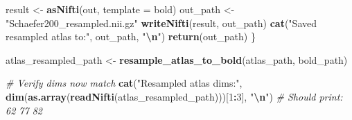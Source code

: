 \documentclass[
]{article}
\newenvironment{Shaded}{\begin{snugshade}}{\end{snugshade}}
\newcommand{\AttributeTok}[1]{\textcolor[rgb]{0.13,0.29,0.53}{#1}}
\newcommand{\CommentTok}[1]{\textcolor[rgb]{0.56,0.35,0.01}{\textit{#1}}}
\newcommand{\DecValTok}[1]{\textcolor[rgb]{0.00,0.00,0.81}{#1}}
\newcommand{\FunctionTok}[1]{\textcolor[rgb]{0.13,0.29,0.53}{\textbf{#1}}}
\newcommand{\NormalTok}[1]{#1}
\newcommand{\OtherTok}[1]{\textcolor[rgb]{0.56,0.35,0.01}{#1}}
\newcommand{\SpecialCharTok}[1]{\textcolor[rgb]{0.81,0.36,0.00}{\textbf{#1}}}
\newcommand{\StringTok}[1]{\textcolor[rgb]{0.31,0.60,0.02}{#1}}
\begin{document}
\begin{Shaded}
\begin{Highlighting}[]
\NormalTok{  result   }\OtherTok{\textless{}{-}} \FunctionTok{asNifti}\NormalTok{(out, }\AttributeTok{template =}\NormalTok{ bold)}
\NormalTok{  out\_path }\OtherTok{\textless{}{-}} \StringTok{"Schaefer200\_resampled.nii.gz"}
  \FunctionTok{writeNifti}\NormalTok{(result, out\_path)}
  \FunctionTok{cat}\NormalTok{(}\StringTok{"Saved resampled atlas to:"}\NormalTok{, out\_path, }\StringTok{"}\SpecialCharTok{\textbackslash{}n}\StringTok{"}\NormalTok{)}
  \FunctionTok{return}\NormalTok{(out\_path)}
\NormalTok{\}}

\NormalTok{atlas\_resampled\_path }\OtherTok{\textless{}{-}} \FunctionTok{resample\_atlas\_to\_bold}\NormalTok{(atlas\_path, bold\_path)}

\CommentTok{\# Verify dims now match}
\FunctionTok{cat}\NormalTok{(}\StringTok{"Resampled atlas dims:"}\NormalTok{, }\FunctionTok{dim}\NormalTok{(}\FunctionTok{as.array}\NormalTok{(}\FunctionTok{readNifti}\NormalTok{(atlas\_resampled\_path)))[}\DecValTok{1}\SpecialCharTok{:}\DecValTok{3}\NormalTok{], }\StringTok{"}\SpecialCharTok{\textbackslash{}n}\StringTok{"}\NormalTok{)}
\CommentTok{\# Should print: 62 77 82}
\end{Highlighting}
\end{Shaded}

\begin{Shaded}
\end{Shaded}
\end{document}

